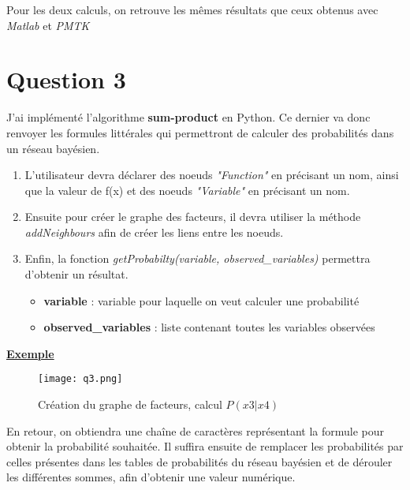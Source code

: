 \documentclass[12pt]{article}
\begin{document}
Pour les deux calculs, on retrouve les mêmes résultats que ceux obtenus avec \textit{Matlab} et \textit{PMTK}

\section{Question 3}
J'ai implémenté l'algorithme \textbf{sum-product} en Python. Ce dernier va donc renvoyer les formules littérales qui permettront de calculer des probabilités dans un réseau bayésien.
\begin{enumerate}
\item L'utilisateur devra déclarer des noeuds \textit{"Function"} en précisant un nom, ainsi que la valeur de f(x) et des noeuds \textit{"Variable"} en précisant un nom.

\item Ensuite pour créer le graphe des facteurs, il devra utiliser la méthode \textit{addNeighbours} afin de créer les liens entre les noeuds.

\item Enfin, la fonction \textit{getProbabilty(variable, observed\_variables)} permettra d'obtenir un résultat.
\begin{itemize}
\item \textbf{variable} : variable pour laquelle on veut calculer une probabilité 
\item \textbf{observed\_variables} : liste contenant toutes les variables observées
\\ \linebreak
\end{itemize}
\end{enumerate}

\textbf{\underline{Exemple}}
\begin{figure}[H]
\begin{center}
  \texttt{[image: q3.png]}
  \caption{Création du graphe de facteurs, calcul $P(x3|x4)$}
  \label{fig:Exemple}
\end{center}
\end{figure}

En retour, on obtiendra une chaîne de caractères représentant la formule pour obtenir la probabilité souhaitée. Il suffira ensuite de remplacer les probabilités par celles présentes dans les tables de probabilités du réseau bayésien et de dérouler les différentes sommes, afin d'obtenir une valeur numérique.
\end{document}
